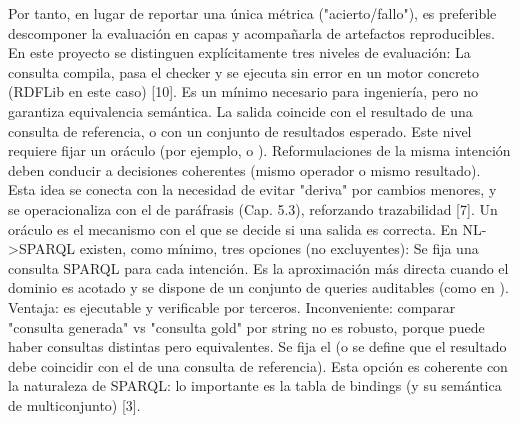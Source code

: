 {}Por tanto, en lugar de reportar una única métrica ("acierto/fallo"), es preferible descomponer la evaluación en capas y acompañarla de artefactos reproducibles.\markdownRendererInterblockSeparator
{}En este proyecto se distinguen explícitamente tres niveles de evaluación:\markdownRendererInterblockSeparator
{}\markdownRendererUlBeginTight
\markdownRendererUlItem {} La consulta compila, pasa el checker y se ejecuta sin error en un motor concreto (RDFLib en este caso) [10]. Es un mínimo necesario para ingeniería, pero no garantiza equivalencia semántica.\markdownRendererUlItemEnd 
\markdownRendererUlItem {} La salida coincide con el resultado de una consulta de referencia, o con un conjunto de resultados esperado. Este nivel requiere fijar un oráculo (por ejemplo,  o ).\markdownRendererUlItemEnd 
\markdownRendererUlItem {} Reformulaciones de la misma intención deben conducir a decisiones coherentes (mismo operador o mismo resultado). Esta idea se conecta con la necesidad de evitar "deriva" por cambios menores, y se operacionaliza con el  de paráfrasis (Cap. 5.3), reforzando trazabilidad [7].\markdownRendererUlItemEnd 
\markdownRendererUlEndTight \markdownRendererInterblockSeparator
{}\markdownRendererInterblockSeparator
{}Un oráculo es el mecanismo con el que se decide si una salida es correcta. En NL->SPARQL existen, como mínimo, tres opciones (no excluyentes):\markdownRendererInterblockSeparator
{}\markdownRendererUlBeginTight
\markdownRendererUlItem {} Se fija una consulta SPARQL para cada intención. Es la aproximación más directa cuando el dominio es acotado y se dispone de un conjunto de queries auditables (como en ). Ventaja: es ejecutable y verificable por terceros. Inconveniente: comparar "consulta generada" vs "consulta gold" por string no es robusto, porque puede haber consultas distintas pero equivalentes.\markdownRendererUlItemEnd 
\markdownRendererUlItem {} Se fija el  (o se define que el resultado debe coincidir con el de una consulta de referencia). Esta opción es coherente con la naturaleza de SPARQL: lo importante es la tabla de bindings (y su semántica de multiconjunto) [3].\markdownRendererUlItemEnd 
